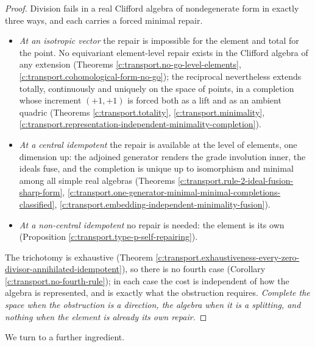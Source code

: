 \documentclass[11pt]{article}
\theoremstyle{definition}
\theoremstyle{plain}
\begin{document}
\begin{proof}
Division fails in a real Clifford algebra of nondegenerate form in exactly three ways, and each carries a forced minimal repair.
\begin{itemize}
\item \emph{At an isotropic vector} the repair is impossible for the element and total for the point. No equivariant element-level repair exists in the Clifford algebra of any extension (Theorems \ref{c:transport.no-go-level-elements}, \ref{c:transport.cohomological-form-no-go}); the reciprocal nevertheless extends totally, continuously and uniquely on the space of points, in a completion whose increment $(+1,+1)$ is forced both as a lift and as an ambient quadric (Theorems \ref{c:transport.totality}, \ref{c:transport.minimality}, \ref{c:transport.representation-independent-minimality-completion}).
\item \emph{At a central idempotent} the repair is available at the level of elements, one dimension up: the adjoined generator renders the grade involution inner, the ideals fuse, and the completion is unique up to isomorphism and minimal among all simple real algebras (Theorems \ref{c:transport.rule-2-ideal-fusion-sharp-form}, \ref{c:transport.one-generator-minimal-minimal-completions-classified}, \ref{c:transport.embedding-independent-minimality-fusion}).
\item \emph{At a non-central idempotent} no repair is needed: the element is its own (Proposition \ref{c:transport.type-p-self-repairing}).
\end{itemize}
The trichotomy is exhaustive (Theorem \ref{c:transport.exhaustiveness-every-zero-divisor-annihilated-idempotent}), so there is no fourth case (Corollary \ref{c:transport.no-fourth-rule}); in each case the cost is independent of how the algebra is represented, and is exactly what the obstruction requires. \emph{Complete the space when the obstruction is a direction, the algebra when it is a splitting, and nothing when the element is already its own repair.}

\end{proof}

We turn to a further ingredient.
\end{document}
